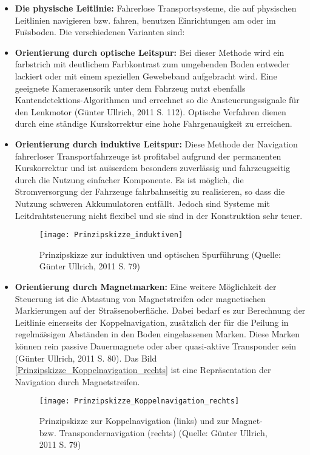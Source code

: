 \begin{itemize}
	\item \textbf{Die physische Leitlinie:}  Fahrerlose Transportsysteme, die auf physischen Leitlinien navigieren bzw. fahren, benutzen Einrichtungen am oder im Fu\"ssboden. Die verschiedenen Varianten sind:
 \item \textbf{Orientierung durch optische Leitspur:} Bei dieser Methode wird ein farbstrich mit deutlichem Farbkontrast zum umgebenden Boden entweder lackiert oder mit einem speziellen Gewebeband aufgebracht wird. Eine geeignete Kamerasensorik unter dem Fahrzeug nutzt ebenfalls Kantendetektions-Algorithmen  und errechnet so die Ansteuerungssignale f\"ur den Lenkmotor (G\"unter Ullrich, 2011 S. 112). Optische Verfahren dienen durch eine st\"andige Kurskorrektur eine hohe  Fahrgenauigkeit zu erreichen. 
\item \textbf{Orientierung durch induktive Leitspur:} Diese Methode der Navigation fahrerloser Transportfahrzeuge ist profitabel aufgrund der permanenten Kurskorrektur und ist au\"sserdem besonders zuverl\"assig und fahrzeugseitig durch die Nutzung einfacher Komponente. Es ist m\"oglich, die Stromversorgung der Fahrzeuge fahrbahnseitig zu realisieren, so dass die Nutzung schweren Akkumulatoren entf\"allt. Jedoch sind Systeme mit Leitdrahtsteuerung nicht flexibel und sie sind in der Konstruktion sehr teuer.
	\begin{figure}[h!]
	\centering
  \texttt{[image: Prinzipskizze\_induktiven]}
	\caption{Prinzipskizze zur induktiven und optischen Spurf\"uhrung (Quelle: G\"unter Ullrich, 2011 S. 79)}
	\label{Prinzipskizze_induktiven}
\end{figure}  
	\item \textbf{Orientierung durch Magnetmarken:} Eine weitere M\"oglichkeit der Steuerung ist die Abtastung von Magnetstreifen oder magnetischen Markierungen auf der Stra\"ssenoberfl\"ache. Dabei bedarf es zur Berechnung der Leitlinie einerseits der Koppelnavigation, zus\"atzlich der f\"ur die Peilung in regelm\"a\"ssigen Abst\"anden in den Boden eingelassenen Marken. Diese Marken k\"onnen rein passive Dauermagnete oder aber quasi-aktive Transponder sein (G\"unter Ullrich, 2011 S. 80). Das Bild \ref{Prinzipskizze_Koppelnavigation_rechts} ist eine Repr\"asentation der Navigation durch Magnetstreifen.
	\begin{figure}[h!]
	\centering
  \texttt{[image: Prinzipskizze\_Koppelnavigation\_rechts]}
	\caption{Prinzipskizze zur Koppelnavigation (links) und zur Magnet- bzw. Transpondernavigation (rechts) (Quelle: G\"unter Ullrich, 2011 S. 79)}

\end{figure}
\end{itemize}
